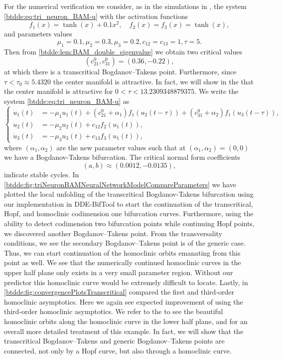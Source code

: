 For the numerical verification we consider, as in the simulations in
\cite[Example 1]{dong2013bogdanov}, the system \cref{btdde:eq:tri_neuron_BAM-u} with
the activation functions
\[
f_{1}(x)=\tanh(x)+0.1x^{2},\quad f_{2}(x)=f_{3}(x)=\tanh(x),
\]
and parameters values
\[
\mu_{1}=0.1,\mu_{2}=0.3,\mu_{3}=0.2,c_{12}=c_{13}=1,\tau=5.
\]
Then from \cref{btdde:lem:BAM_double_eigenvalue} we obtain two critical
values 
\[
(c_{21}^{0},c_{31}^{0})=(0.36,-0.22),
\]
at which there is a transcritical Bogdanov--Takens point. Furthermore, since
$\tau < \tau_0 \approx 5.4320$ the center manifold is attractive. In fact, we
will show in the
\fi that the center manifold is attractive for
$0<\tau<13.2309348879375$. We write the system \cref{btdde:eq:tri_neuron_BAM-u}
as
\begin{equation}
\label{btdde:eq:tri_neuron_BAM-u-1}
\begin{cases}
\dot{u}_{1}(t) & =-\mu_{1}u_{1}(t)+\left(c_{21}^{0}+\alpha_{1}\right)f_{1}(u_{2}(t-\tau))+\left(c_{31}^{0}+\alpha_{2}\right)f_{1}(u_{3}(t-\tau)),\\
\dot{u}_{2}(t) & =-\mu_{2}u_{2}(t)+c_{12}f_{2}(u_{1}(t)),\\
\dot{u}_{3}(t) & =-\mu_{3}u_{3}(t)+c_{13}f_{3}(u_{1}(t)),
\end{cases}
\end{equation}
where $(\alpha_{1},\alpha_{2})$ are the new parameter values such
that at $(\alpha_{1},\alpha_{2})=(0,0)$ we have a Bogdanov-Takens
bifurcation. The critical normal form coefficients 
\[
(a,b)\approx(0.0012,-0.0135),
\]
indicate stable cycles. In
\cref{btdde:fig:triNeuronBAMNeuralNetworkModelCompareParameters} we have plotted the
local unfolding of the transcritical Bogdanov-Takens bifurcation using our
implementation in DDE-BifTool to start the continuation of the transcritical,
Hopf, and homoclinic codimension one bifurcation curves. Furthermore, using the
ability to detect codimension two bifurcation points while continuing Hopf
points, we discovered another Bogdanov--Takens point. From the transversality
conditions, we see the secondary Bogdanov--Takens point is of the generic case.
Thus, we can start continuation of the homoclinic orbits emanating from this
point as well. We see that the numerically continued homoclinic curves in the
upper half plane only exists in a very small parameter region. Without our
predictor this homoclinic curve would be extremely difficult to locate. Lastly,
in \cref{btdde:fig:convergencePlotsTranscritical} compared the first and third-order
homoclinic asymptotics. Here we again see expected improvement of using the
third-order homoclinic asymptotics. We refer to the
\fi to see the beautiful
homoclinic orbits along the homoclinic curve in the lower half plane, and for
an overall more detailed treatment of this example. In fact, we will show that
the transcritical Bogdanov--Takens and generic Bogdanov--Takens points are
connected, not only by a Hopf curve, but also through a homoclinic curve. 

